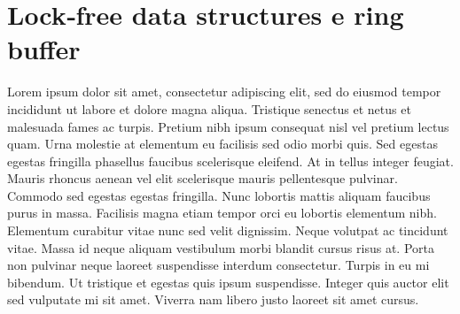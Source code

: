 \section[Lock‑free data structures e ring buffer]{Lock‑free data structures e ring buffer}

Lorem ipsum dolor sit amet, consectetur adipiscing elit, sed do eiusmod tempor incididunt ut labore et dolore magna aliqua. Tristique senectus et netus et malesuada fames ac turpis. Pretium nibh ipsum consequat nisl vel pretium lectus quam. Urna molestie at elementum eu facilisis sed odio morbi quis. Sed egestas egestas fringilla phasellus faucibus scelerisque eleifend. At in tellus integer feugiat. Mauris rhoncus aenean vel elit scelerisque mauris pellentesque pulvinar. Commodo sed egestas egestas fringilla. Nunc lobortis mattis aliquam faucibus purus in massa. Facilisis magna etiam tempor orci eu lobortis elementum nibh. Elementum curabitur vitae nunc sed velit dignissim. Neque volutpat ac tincidunt vitae. Massa id neque aliquam vestibulum morbi blandit cursus risus at. Porta non pulvinar neque laoreet suspendisse interdum consectetur. Turpis in eu mi bibendum. Ut tristique et egestas quis ipsum suspendisse. Integer quis auctor elit sed vulputate mi sit amet. Viverra nam libero justo laoreet sit amet cursus.

